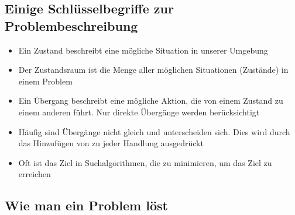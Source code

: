 \subsection{Einige Schlüsselbegriffe zur Problembeschreibung}
\begin{defBox}[title=Der Zustandsraum/Zustände]
    \begin{itemize}
        \item {} Ein Zustand beschreibt eine mögliche Situation in unserer Umgebung
        \item {} Der Zustandsraum ist die Menge aller möglichen Situationen (Zustände) in einem Problem
    \end{itemize}
\end{defBox}
\begin{defBox}[title=Übergänge/Handlungen]
    \begin{itemize}
        \item {} Ein Übergang beschreibt eine mögliche Aktion, die von einem Zustand zu einem anderen führt. Nur direkte Übergänge werden berücksichtigt
    \end{itemize}
\end{defBox}
\begin{defBox}[title=Kosten]
    \begin{itemize}
        \item {} Häufig sind Übergänge nicht gleich und unterscheiden sich. Dies wird durch das Hinzufügen von  zu jeder Handlung ausgedrückt
        \item Oft ist das Ziel in Suchalgorithmen, die  zu minimieren, um das Ziel zu erreichen
    \end{itemize}
\end{defBox}
\subsection{Wie man ein Problem löst}
